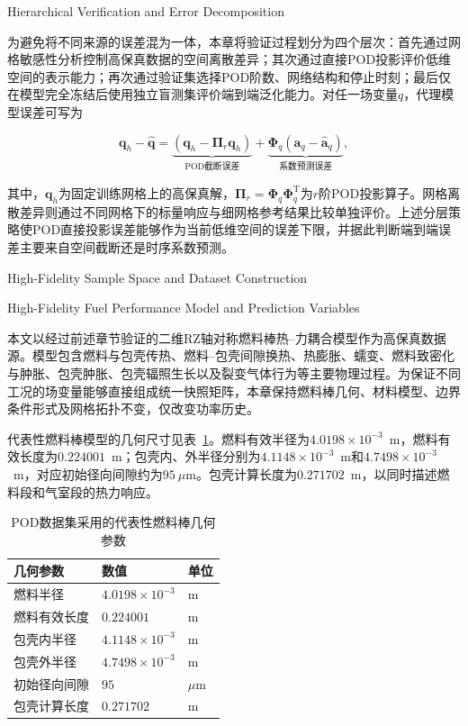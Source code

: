 {Hierarchical Verification and Error Decomposition}

为避免将不同来源的误差混为一体，本章将验证过程划分为四个层次：首先通过网格敏感性分析控制高保真数据的空间离散差异；其次通过直接POD投影评价低维空间的表示能力；再次通过验证集选择POD阶数、网络结构和停止时刻；最后仅在模型完全冻结后使用独立盲测集评价端到端泛化能力。对任一场变量$q$，代理模型误差可写为

\begin{equation}
	\boldsymbol q_h-\widehat{\boldsymbol q}
	=
	\underbrace{\left(\boldsymbol q_h-\boldsymbol\Pi_r\boldsymbol q_h\right)}
	_{\text{POD截断误差}}
	+
	\underbrace{\boldsymbol\Phi_q
		\left(\boldsymbol a_q-\widehat{\boldsymbol a}_q\right)}
	_{\text{系数预测误差}},
	\label{eq:ch6_surrogate_error_decomposition}
\end{equation}

其中，$\boldsymbol q_h$为固定训练网格上的高保真解，$\boldsymbol\Pi_r=\boldsymbol\Phi_q\boldsymbol\Phi_q^{\mathrm T}$为$r$阶POD投影算子。网格离散差异则通过不同网格下的标量响应与细网格参考结果比较单独评价。上述分层策略使POD直接投影误差能够作为当前低维空间的误差下限，并据此判断端到端误差主要来自空间截断还是时序系数预测。

{High-Fidelity Sample Space and Dataset Construction}

{High-Fidelity Fuel Performance Model and Prediction Variables}

本文以经过前述章节验证的二维RZ轴对称燃料棒热--力耦合模型作为高保真数据源。模型包含燃料与包壳传热、燃料--包壳间隙换热、热膨胀、蠕变、燃料致密化与肿胀、包壳肿胀、包壳辐照生长以及裂变气体行为等主要物理过程。为保证不同工况的场变量能够直接组成统一快照矩阵，本章保持燃料棒几何、材料模型、边界条件形式及网格拓扑不变，仅改变功率历史。

代表性燃料棒模型的几何尺寸见表~\ref{tab:pod_geometry}。燃料有效半径为$4.0198\times10^{-3}$~m，燃料有效长度为$0.224001$~m；包壳内、外半径分别为$4.1148\times10^{-3}$~m和$4.7498\times10^{-3}$~m，对应初始径向间隙约为$95~\mu$m。包壳计算长度为$0.271702$~m，以同时描述燃料段和气室段的热力响应。

\begin{table}[htbp]
	\centering
	\caption{POD数据集采用的代表性燃料棒几何参数}
	\label{tab:pod_geometry}
	\begin{tabularx}{\textwidth}
		{>{\centering\arraybackslash}X
			>{\centering\arraybackslash}p{3.0cm}
			>{\centering\arraybackslash}p{3.0cm}}
		\toprule
		几何参数 & 数值 & 单位 \\
		\midrule
		燃料半径 & $4.0198\times10^{-3}$ & m \\
		燃料有效长度 & $0.224001$ & m \\
		包壳内半径 & $4.1148\times10^{-3}$ & m \\
		包壳外半径 & $4.7498\times10^{-3}$ & m \\
		初始径向间隙 & $95$ & $\mu$m \\
		包壳计算长度 & $0.271702$ & m \\
		\bottomrule
	\end{tabularx}
\end{table}


